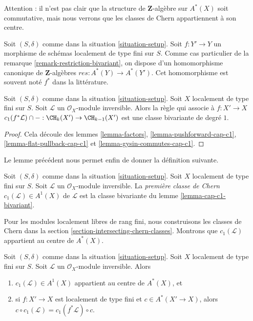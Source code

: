 \noindent
Attention : il n'est pas clair que la structure de $\mathbf{Z}$-algèbre
sur $A^*(X)$ soit commutative, mais nous verrons que les classes de Chern appartiennent
à son centre.

\begin{remark}
\label{remark-pullback-cohomology}
Soit $(S, \delta)$ comme dans la situation \ref{situation-setup}.
Soit $f : Y' \to Y$ un morphisme de schémas localement de type fini sur $S$.
Comme cas particulier de la remarque \ref{remark-restriction-bivariant},
on dispose d'un homomorphisme canonique de $\mathbf{Z}$-algèbres $res : A^*(Y) \to A^*(Y')$.
Cet homomorphisme est souvent noté $f^*$ dans la littérature.
\end{remark}

\begin{lemma}
\label{lemma-cap-c1-bivariant}
Soit $(S, \delta)$ comme dans la situation \ref{situation-setup}.
Soit $X$ localement de type fini sur $S$.
Soit $\mathcal{L}$ un $\mathcal{O}_X$-module inversible.
Alors la règle qui associe à $f : X' \to X$
$c_1(f^*\mathcal{L}) \cap - : \CH_k(X') \to \CH_{k - 1}(X')$
est une classe bivariante de degré $1$.
\end{lemma}

\begin{proof}
Cela découle des lemmes \ref{lemma-factors},
\ref{lemma-pushforward-cap-c1},
\ref{lemma-flat-pullback-cap-c1} et
\ref{lemma-gysin-commutes-cap-c1}.
\end{proof}

\noindent
Le lemme précédent nous permet enfin de donner la définition suivante.

\begin{definition}
\label{definition-first-chern-class}
Soit $(S, \delta)$ comme dans la situation \ref{situation-setup}. Soit $X$
localement de type fini sur $S$. Soit $\mathcal{L}$ un
$\mathcal{O}_X$-module inversible. La {\it première classe de Chern}
$c_1(\mathcal{L}) \in A^1(X)$ de $\mathcal{L}$
est la classe bivariante du lemme \ref{lemma-cap-c1-bivariant}.
\end{definition}

\noindent
Pour les modules localement libres de rang fini, nous construisons les classes de Chern dans la
section \ref{section-intersecting-chern-classes}.
Montrons que $c_1(\mathcal{L})$ appartient au centre de $A^*(X)$.

\begin{lemma}
\label{lemma-c1-center}
Soit $(S, \delta)$ comme dans la situation \ref{situation-setup}.
Soit $X$ localement de type fini sur $S$.
Soit $\mathcal{L}$ un $\mathcal{O}_X$-module inversible.
Alors
\begin{enumerate}
\item $c_1(\mathcal{L}) \in A^1(X)$ appartient au centre de $A^*(X)$, et
\item si $f : X' \to X$ est localement de type fini et $c \in A^*(X' \to X)$,
alors $c \circ c_1(\mathcal{L}) = c_1(f^*\mathcal{L}) \circ c$.
\end{enumerate}
\end{lemma}

